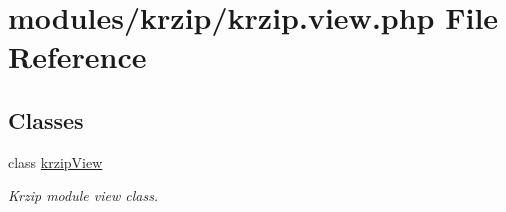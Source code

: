 \hypertarget{krzip_8view_8php}{\section{modules/krzip/krzip.view.\-php File Reference}
\label{krzip_8view_8php}
}
\subsection*{Classes}
\begin{DoxyCompactItemize}
\item 
class \hyperlink{classkrzipView}{krzip\-View}
\begin{DoxyCompactList}\small\item\em Krzip module view class. \end{DoxyCompactList}\end{DoxyCompactItemize}

